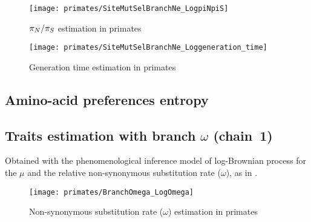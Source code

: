 \begin{figure}[H]
    \centering
    \texttt{[image: primates/SiteMutSelBranchNe\_LogpiNpiS]}
    \caption[$\pnps$ estimation in primates]{$\pnps$ estimation in primates}
\end{figure}

\begin{figure}[H]
    \centering
    \texttt{[image: primates/SiteMutSelBranchNe\_Loggeneration\_time]}
    \caption[Generation time estimation in primates]{Generation time estimation in primates}
\end{figure}

\subsection{Amino-acid preferences entropy}

\begin{table}[H]
    \centering
    \noindent{}
    \caption[Amino-acid entropy in primates]{Estimated amino-acid entropy in primates.
    Obtained with the mechanistic inference model developed in this paper of site-specific amino-acid fitness profiles and log-Brownian process for $\Ne$, $\mu$ and life-history traits (in the left column), or under the assumption of constant $\Ne$ (in the right column).}
\end{table}

\subsection{Traits estimation with branch \texorpdfstring{$\omega$}{ω} (chain~1)}
Obtained with the phenomenological inference model of log-Brownian process for the $\mu$ and the relative non-synonymous substitution rate ($\omega$), as in \citet{Lartillot2011}.

\begin{figure}[H]
    \centering
    \texttt{[image: primates/BranchOmega\_LogOmega]}
    \caption[$\omega$ estimation in primates]{{Non-synonymous substitution} rate ($\omega$) estimation in primates}
\end{figure}

